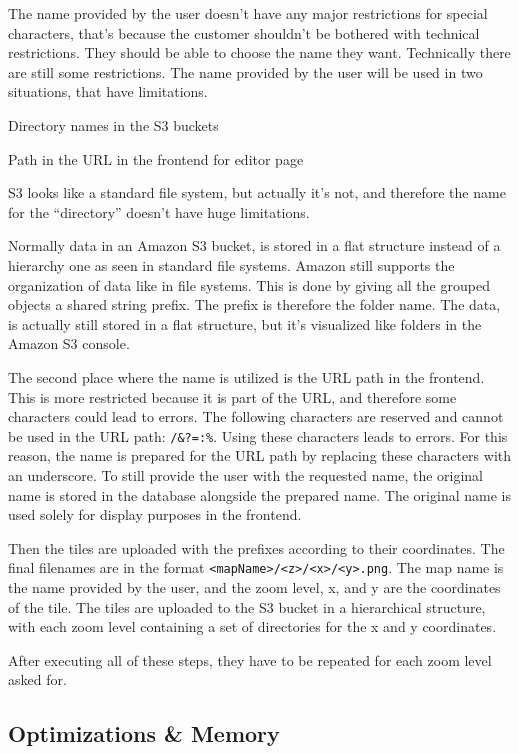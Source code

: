 The name provided by the user doesn't have any major restrictions for special characters, that's because the customer shouldn't be bothered with technical restrictions. They should be able to choose the name they want. Technically there are still some restrictions. The name provided by the user will be used in two situations, that have limitations. 
\begin{compactenum}
    \item Directory names in the S3 buckets
    \item Path in the URL in the frontend for editor page
\end{compactenum}

S3 looks like a standard file system, but actually it's not, and therefore the name for the ``directory'' doesn't have huge limitations. 

Normally data in an Amazon S3 bucket, is stored in a flat structure instead of a hierarchy one as seen in standard file systems. Amazon still supports the organization of data like in file systems. This is done by giving all the grouped objects a shared string prefix. The prefix is therefore the folder name. The data, is actually still stored in a flat structure, but it's visualized like folders in the Amazon S3 console.

The second place where the name is utilized is the URL path in the frontend. This is more restricted because it is part of the URL, and therefore some characters could lead to errors. The following characters are reserved and cannot be used in the URL path: \texttt{/\&?=:\%}. Using these characters leads to errors. For this reason, the name is prepared for the URL path by replacing these characters with an underscore. To still provide the user with the requested name, the original name is stored in the database alongside the prepared name. The original name is used solely for display purposes in the frontend.

Then the tiles are uploaded with the prefixes according to their coordinates. The final filenames are in the format \texttt{<mapName>/<z>/<x>/<y>.png}. The map name is the name provided by the user, and the zoom level, x, and y are the coordinates of the tile. The tiles are uploaded to the S3 bucket in a hierarchical structure, with each zoom level containing a set of directories for the x and y coordinates.

After executing all of these steps, they have to be repeated for each zoom level asked for. 

\subsection{Optimizations \& Memory}

